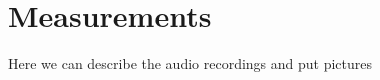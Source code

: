 \chapter{Measurements}\label{ch:measurements}

Here we can describe the audio recordings and put pictures
